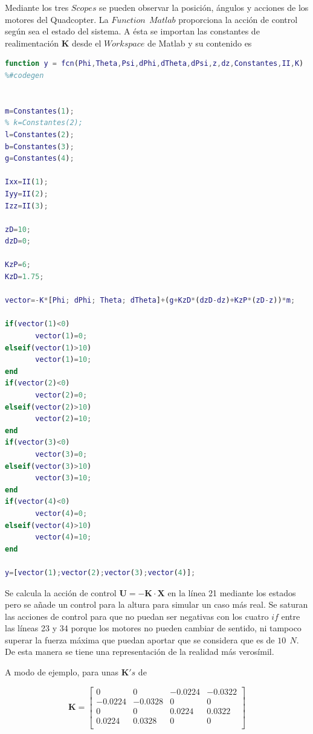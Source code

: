 \documentclass[twoside,11pt]{report}
\begin{document}
Mediante los tres $Scopes$ se pueden observar la posición, ángulos y acciones de los motores del Quadcopter. La $Function \>\> Matlab$ proporciona la acción de control según sea el estado del sistema. A ésta se importan las constantes de realimentación $\mathbf{K}$ desde el $Workspace$ de Matlab y su contenido es

\begin{lstlisting}[language=Matlab]
function y = fcn(Phi,Theta,Psi,dPhi,dTheta,dPsi,z,dz,Constantes,II,K)
%#codegen


m=Constantes(1);
% k=Constantes(2);
l=Constantes(2);
b=Constantes(3);
g=Constantes(4);

Ixx=II(1);
Iyy=II(2);
Izz=II(3);

zD=10;
dzD=0;

KzP=6;
KzD=1.75;

vector=-K*[Phi; dPhi; Theta; dTheta]+(g+KzD*(dzD-dz)+KzP*(zD-z))*m;

if(vector(1)<0) 
       vector(1)=0;
elseif(vector(1)>10)
       vector(1)=10;
end
if(vector(2)<0) 
       vector(2)=0;
elseif(vector(2)>10)
       vector(2)=10;       
end
if(vector(3)<0) 
       vector(3)=0;
elseif(vector(3)>10)
       vector(3)=10;       
end
if(vector(4)<0) 
       vector(4)=0;       
elseif(vector(4)>10)
       vector(4)=10;       
end
 
y=[vector(1);vector(2);vector(3);vector(4)];
\end{lstlisting}

Se calcula la acción de control $\mathbf{U}=-\mathbf{K} \cdot \mathbf{X}$ en la línea 21 mediante los estados pero se añade un control para la altura para simular un caso más real. Se saturan las acciones de control para que no puedan ser negativas con los cuatro $if$ entre las líneas 23 y 34 porque los motores no pueden cambiar de sentido, ni tampoco superar la fuerza máxima que puedan aportar que se considera que es de $10\>\>N$. De esta manera se tiene una representación de la realidad más verosímil. 

A modo de ejemplo, para unas $\mathbf{K}'s$ de

\begin{equation}
\mathbf{K}=\left[ \begin{array}{cccc}
         0 &         0 &  -0.0224 &  -0.0322 \\
   -0.0224 &  -0.0328    &     0  &       0 \\
         0      &   0  &  0.0224 &   0.0322 \\
    0.0224  &  0.0328  &       0    &     0 \\
\end{array} \right]
\end{equation}
\end{document}
